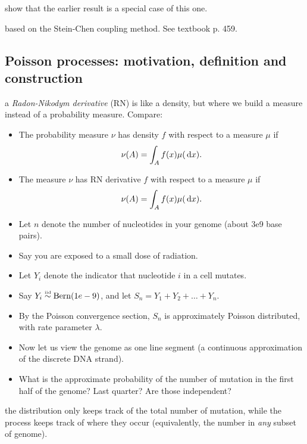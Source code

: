 \documentclass{article}
\begin{document}
 show that the earlier result is a special case of this one.

 based on the Stein-Chen coupling method. See textbook p. 459. 


\subsection{Poisson processes: motivation, definition and construction}

 a \emph{Radon-Nikodym derivative} (RN) is like a density, but where we build a measure instead of a probability measure. Compare:
\begin{itemize} 
  \item The probability measure $\nu$ has density $f$ with respect to a measure $\mu$ if \[ \nu(A) = \int_A f(x) \mu(\,\mathrm{d} x). \]
  \item The measure $\nu$ has RN derivative $f$ with respect to a measure $\mu$ if \[ \nu(A) = \int_A f(x) \mu(\,\mathrm{d} x). \]
\end{itemize}

\begin{itemize}
  \item Let $n$ denote the number of nucleotides in your genome (about 3e9 base pairs). 
  \item Say you are exposed to a small dose of radiation. 
  \item Let $Y_i$ denote the indicator that nucleotide $i$ in a cell mutates. 
  \item Say $Y_i \stackrel{\scriptscriptstyle \textrm{iid}}{\sim} \operatorname{Bern}(1e-9)$, and let $S_n = Y_1 + Y_2 + \dots + Y_n$.  
  \item By the Poisson convergence section, $S_n$ is approximately Poisson distributed, with rate parameter $\lambda$.
  \item Now let us view the genome as one line segment (a continuous approximation of the discrete DNA strand). 
  \item What is the approximate probability of the number of mutation in the first half of the genome? Last quarter? Are those independent?
\end{itemize}

 the distribution only keeps track of the total number of mutation, while the process keeps track of where they occur (equivalently, the number in \emph{any} subset of genome).
\end{document}
